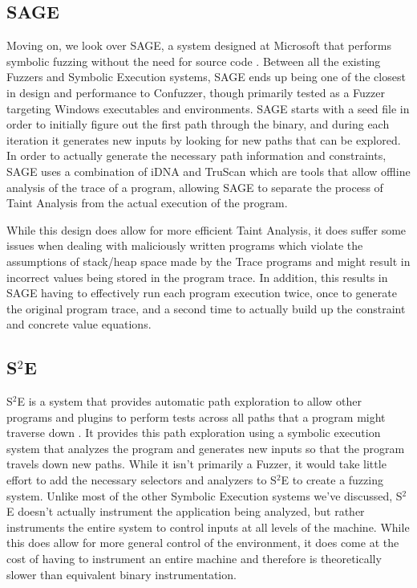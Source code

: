 \subsection{SAGE}
Moving on, we look over SAGE, a system designed at Microsoft that performs
symbolic fuzzing without the need for source code \cite{sage}. Between
all the existing Fuzzers and Symbolic Execution systems, SAGE ends up being one
of the closest in design and performance to Confuzzer, though primarily tested
as a Fuzzer targeting Windows executables and environments. SAGE starts with a
seed file in order to initially figure out the first path through the binary,
and during each iteration it generates new inputs by looking for new paths that
can be explored. In order to actually generate the necessary path information
and constraints, SAGE uses a combination of iDNA and TruScan which are tools
that allow offline analysis of the trace of a program, allowing SAGE to separate
the process of Taint Analysis from the actual execution of the program.

While this design does allow for more efficient Taint Analysis, it does suffer
some issues when dealing with maliciously written programs which violate the
assumptions of stack/heap space made by the Trace programs and might result in
incorrect values being stored in the program trace. In addition, this results in
SAGE having to effectively run each program execution twice, once to generate
the original program trace, and a second time to actually build up the
constraint and concrete value equations.

\subsection{S$^2$E}
S$^2$E is a system that provides automatic path exploration to allow other
programs and plugins to perform tests across all paths that a program might
traverse down \cite{s2e}. It provides this path exploration using a symbolic
execution system that analyzes the program and generates new inputs so that the
program travels down new paths. While it isn't primarily a Fuzzer, it would take
little effort to add the necessary selectors and analyzers to S$^2$E to create a
fuzzing system. Unlike most of the other Symbolic Execution systems we've
discussed, S$^2$E doesn't actually instrument the application being analyzed,
but rather instruments the entire system to control inputs at all levels of the
machine. While this does allow for more general control of the environment, it
does come at the cost of having to instrument an entire machine and therefore is
theoretically slower than equivalent binary instrumentation. 

